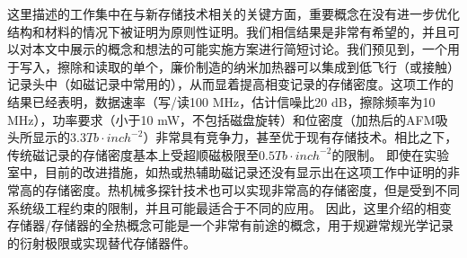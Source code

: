 这里描述的工作集中在与新存储技术相关的关键方面，重要概念在没有进一步优化结构和材料的情况下被证明为原则性证明。我们相信结果是非常有希望的，并且可以对本文中展示的概念和想法的可能实施方案进行简短讨论。我们预见到，一个用于写入，擦除和读取的单个，廉价制造的纳米加热器可以集成到低飞行（或接触）记录头中（如磁记录中常用的），从而显着提高相变记录的存储密度。这项工作的结果已经表明，数据速率（写/读100 MHz，估计信噪比20 dB，擦除频率为10 MHz），功率要求（小于10 mW，不包括磁盘旋转）和位密度（加热后的AFM吸头所显示的$3.3Tb \cdot{} inch^{-2}$）非常具有竞争力，甚至优于现有存储技术。相比之下，传统磁记录的存储密度基本上受超顺磁极限至$0.5Tb \cdot{} inch^{-2}$的限制。 即使在实验室中，目前的改进措施，如热或热辅助磁记录还没有显示出在这项工作中证明的非常高的存储密度。热机械多探针技术也可以实现非常高的存储密度，但是受到不同系统级工程约束的限制，并且可能最适合于不同的应用。 因此，这里介绍的相变存储器/存储器的全热概念可能是一个非常有前途的概念，用于规避常规光学记录的衍射极限或实现替代存储器件。
